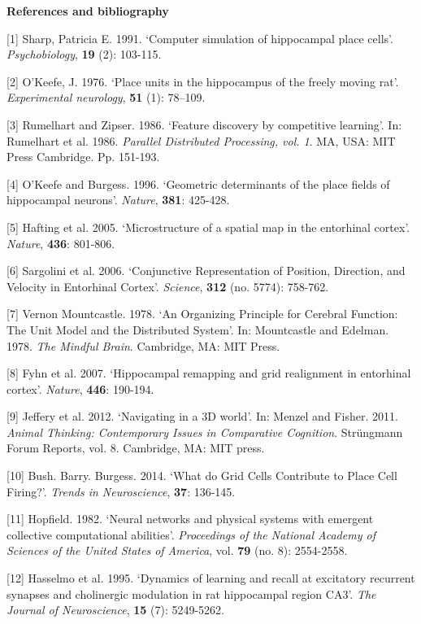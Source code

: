\noindent
\textbf{References and bibliography}

[1] Sharp, Patricia E. 1991. ‘Computer simulation of hippocampal place cells’. \textit{Psychobiology}, \textbf{19} (2): 103-115.

[2] O'Keefe, J. 1976. ‘Place units in the hippocampus of the freely moving rat’. \textit{Experimental neurology}, \textbf{51} (1): 78–109. 

[3] Rumelhart and Zipser. 1986. ‘Feature discovery by competitive learning’. In: Rumelhart et al. 1986. \textit{Parallel Distributed Processing, vol. 1}. MA, USA: MIT Press Cambridge. Pp. 151-193. 

[4] O’Keefe and Burgess. 1996. ‘Geometric determinants of the place fields of hippocampal neurons’. \textit{Nature}, \textbf{381}: 425-428. 

[5] Hafting et al. 2005. ‘Microstructure of a spatial map in the entorhinal cortex’. \textit{Nature}, \textbf{436}: 801-806. 

[6] Sargolini et al. 2006. ‘Conjunctive Representation of Position, Direction, and Velocity in Entorhinal Cortex’. \textit{Science}, \textbf{312} (no. 5774): 758-762. 

[7] Vernon Mountcastle. 1978. ‘An Organizing Principle for Cerebral Function: The Unit Model and the Distributed System’. In: Mountcastle and Edelman. 1978. \textit{The Mindful Brain}. Cambridge, MA: MIT Press. 

[8] Fyhn et al. 2007. ‘Hippocampal remapping and grid realignment in entorhinal cortex’. \textit{Nature}, \textbf{446}: 190-194.  

[9] Jeffery et al. 2012. ‘Navigating in a 3D world’. In: Menzel and Fisher. 2011. \textit{Animal Thinking: Contemporary Issues in Comparative Cognition}. Strüngmann Forum Reports, vol. 8. Cambridge, MA: MIT press. 

[10] Bush. Barry. Burgess. 2014. ‘What do Grid Cells Contribute to Place Cell Firing?’. \textit{Trends in Neuroscience}, \textbf{37}: 136-145. 

[11] Hopfield. 1982. ‘Neural networks and physical systems with emergent collective computational abilities’. \textit{Proceedings of the National Academy of Sciences of the United States of America}, vol. \textbf{79} (no. 8): 2554-2558. 

[12] Hasselmo et al. 1995. ‘Dynamics of learning and recall at excitatory recurrent synapses and cholinergic modulation in rat hippocampal region CA3’. \textit{The Journal of Neuroscience}, \textbf{15} (7): 5249-5262. 

